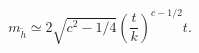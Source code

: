 \begin{equation}
  m_{\tilde{h}} \simeq 2\sqrt{c^2 -1/4}\left( \frac{t}{k}\right) ^{c-1/2}t.
\end{equation}


